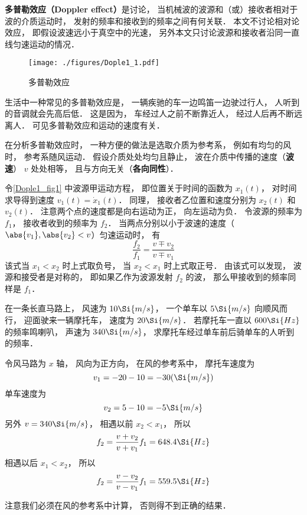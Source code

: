 

\textbf{多普勒效应（Doppler effect）}是讨论， 当机械波的波源和（或）接收者相对于波的介质运动时， 发射的频率和接收到的频率之间有何关联． 本文不讨论相对论效应， 即假设波速远小于真空中的光速， 另外本文只讨论波源和接收者沿同一直线匀速运动的情况．

\begin{figure}[ht]
\centering
\texttt{[image: ./figures/Dople1\_1.pdf]}
\caption{多普勒效应} \label{Dople1_fig1}
\end{figure}

\begin{example}{}
生活中一种常见的多普勒效应是， 一辆疾驰的车一边鸣笛一边驶过行人， 人听到的音调就会先高后低． 这是因为， 车经过人之前不断靠近人， 经过人后再不断远离人． 可见多普勒效应和运动的速度有关．
\end{example}

在分析多普勒效应时， 一种方便的做法是选取介质为参考系， 例如有均匀的风时， 参考系随风运动． 假设介质处处均匀且静止， 波在介质中传播的速度（\textbf{波速}） $v$ 处处相等， 且与方向无关（\textbf{各向同性}）．

令\autoref{Dople1_fig1} 中波源甲运动方程， 即位置关于时间的函数为 $x_1(t)$， 对时间求导得到速度 $v_1(t) = \dot{x}_1(t)$． 同理， 接收者乙位置和速度分别为 $x_2(t)$ 和 $v_2(t)$． 注意两个点的速度都是向右运动为正， 向左运动为负． 令波源的频率为 $f_1$， 接收者收到的频率为 $f_2$． 当两点分别以小于波速的速度（$\abs{v_1}, \abs{v_2} < v$）匀速运动时， 有
\begin{equation}\label{Dople1_eq1}
\frac{f_2}{f_1} = \frac{v \mp v_2}{v \mp v_1}
\end{equation}
该式当 $x_1 < x_2$ 时上式取负号， 当 $x_2 < x_1$ 时上式取正号． 由该式可以发现， 波源和接受者是对称的， 即如果乙作为波源发射 $f_2$ 的波， 那么甲接收到的频率同样是 $f_1$．

\begin{exercise}{}
在一条长直马路上， 风速为 $10\Si{m/s}$， 一个单车以 $5\Si{m/s}$ 向顺风而行， 迎面驶来一辆摩托车， 速度为 $20\Si{m/s}$． 若摩托车一直以 $600\Si{Hz}$ 的频率鸣喇叭， 声速为 $340\Si{m/s}$， 求摩托车经过单车前后骑单车的人听到的频率．

令风马路为 $x$ 轴， 风向为正方向， 在风的参考系中， 摩托车速度为
\begin{equation}
v_1 = -20 - 10 = -30(\Si{m/s})
\end{equation}
单车速度为
\begin{equation}
v_2 = 5 - 10 = -5\Si{m/s}
\end{equation}
另外 $v = 340\Si{m/s}$， 相遇以前 $x_2 < x_1$， 所以
\begin{equation}
f_2 = \frac{v + v_2}{v + v_1} f_1 = 648.4\Si{Hz}
\end{equation}
相遇以后 $x_1 < x_2$， 所以
\begin{equation}
f_2 = \frac{v - v_2}{v - v_1} f_1 = 559.5\Si{Hz}
\end{equation}
\end{exercise}
注意我们必须在风的参考系中计算， 否则得不到正确的结果．


